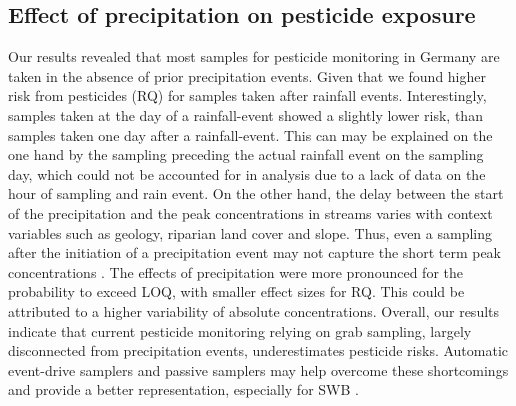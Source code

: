 \documentclass[journal=esthag,manuscript=article]{achemso}
\begin{document}
\subsection{Effect of precipitation on pesticide exposure}
Our results revealed that most samples for pesticide monitoring in Germany are taken in the absence of prior precipitation events. Given that we found higher risk from pesticides (RQ) for samples taken after rainfall events.
Interestingly, samples taken at the day of a rainfall-event showed a slightly lower risk, than samples taken one day after a rainfall-event. This can may be explained on the one hand by the sampling preceding the actual rainfall event on the sampling day, which could not be accounted for in analysis due to a lack of data on the hour of sampling and rain event.
On the other hand, the delay between the start of the precipitation and the peak concentrations in streams varies with context variables such as geology, riparian land cover and slope. Thus, even a sampling after the initiation of a precipitation event may not capture the short term peak concentrations \citep{wittmer_significance_2010}.
The effects of precipitation were more pronounced for the probability to exceed LOQ, with smaller effect sizes for RQ.
This could be attributed to a higher variability of absolute concentrations.
Overall, our results indicate that current pesticide monitoring relying on grab sampling, largely disconnected from precipitation events, underestimates pesticide risks.
Automatic event-drive samplers \citep{stehle_probabilistic_2013} and passive samplers \citep{fernandez_calibration_2014,moschet_evaluation_2015} may help overcome these shortcomings and provide a better representation, especially for SWB \citep{lorenz_specifics_2016}. 
\end{document}
